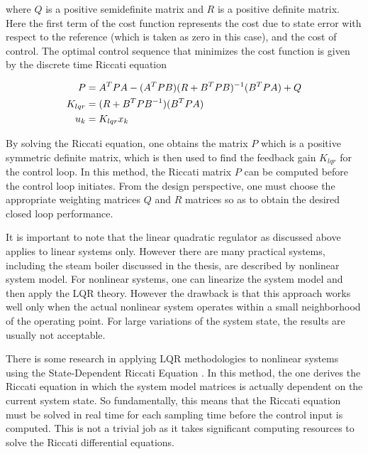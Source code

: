         where $Q$ is a positive semidefinite matrix and $R$ is a positive definite matrix.
        Here the first term of the cost function represents the cost due to state error with respect to the reference (which is taken as zero in this case), and the cost of control.
        The optimal control sequence that minimizes the cost function is given by the discrete time Riccati equation
        
        \begin{equation}
            \label{eq:lqr3}
            \aligned
                P &= A^TPA - (A^TPB)(R+B^TPB)^{-1}(B^TPA)+Q\\
                K_{lqr} & = (R+B^TPB^{-1})(B^TPA)\\
                u_k & = K_{lqr} x_k
            \endaligned
        \end{equation}
        
        By solving the Riccati equation, one obtains the matrix $P$ which is a positive symmetric definite matrix, which is then used to find the feedback gain $K_{lqr}$ for the control loop.  In this method, the Riccati matrix $P$ can be computed before the control loop initiates.  From the design perspective, one must choose the appropriate weighting matrices $Q$ and $R$ matrices so as to obtain the desired closed loop performance.
        
        It is important to note that the linear quadratic regulator as discussed above applies to linear systems only.  However there are many practical systems, including the steam boiler discussed in the thesis, are described by nonlinear system model.  For nonlinear systems, one can linearize the system model and then apply the LQR theory.  However the drawback is that this approach works well only when the actual nonlinear system operates within a small neighborhood of the operating point.  For large variations of the system state, the results are usually not acceptable.
        
        
        There is some research in applying LQR methodologies to nonlinear systems using the State-Dependent Riccati Equation \cite{Korayem}.  In this method, the one derives  the Riccati equation in which the system model matrices is actually dependent on the current system state.  So fundamentally, this means that the Riccati equation must be solved in real time for each sampling time before the control input is computed. This is not a trivial job as it takes significant computing resources to solve the Riccati differential equations.
        
